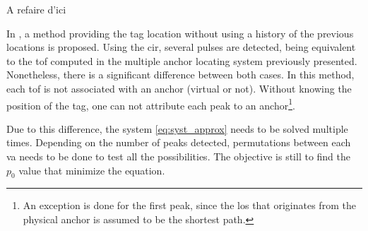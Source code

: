 \color{red} A refaire d'ici \color{black}

In \cite{jespersen2018indoor}, a method providing the tag location without using a history of the previous locations is proposed. Using the \gls{cir}, several pulses are detected, being equivalent to the \gls{tof} computed in the multiple anchor locating system previously presented. Nonetheless, there is a significant difference between both cases. In this method, each \gls{tof} is not associated with an anchor (virtual or not). Without knowing the position of the tag, one can not attribute each peak to an anchor\footnote{An exception is done for the first peak, since the \gls{los} that originates from the physical anchor is assumed to be the shortest path.}.
\vspace{2mm}

Due to this difference, the system \ref{eq:syst_approx} needs to be solved multiple times. Depending on the number of peaks detected, permutations between each \gls{va} needs to be done to test all the possibilities. The objective is still to find the $p_0$ value that minimize the equation.



